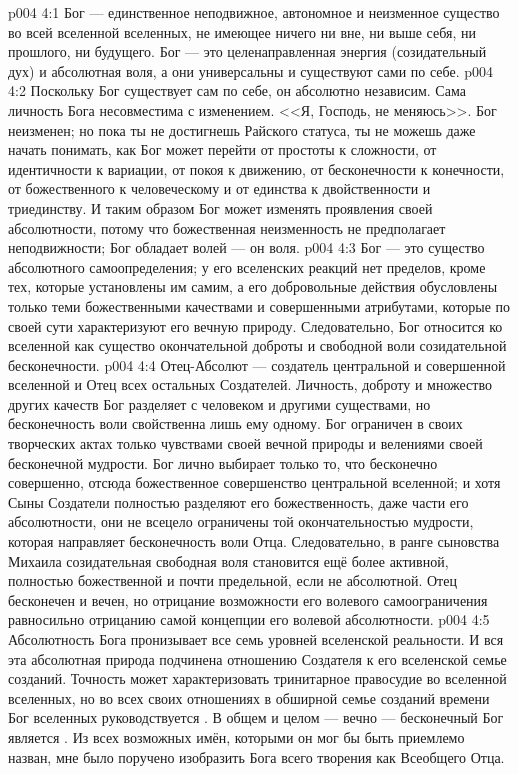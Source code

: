 \vs p004 4:1 Бог --- единственное неподвижное, автономное и неизменное существо во всей вселенной вселенных, не имеющее ничего ни вне, ни выше себя, ни прошлого, ни будущего. Бог --- это целенаправленная энергия (созидательный дух) и абсолютная воля, а они универсальны и существуют сами по себе.
\vs p004 4:2 Поскольку Бог существует сам по себе, он абсолютно независим. Сама личность Бога несовместима с изменением. <<Я, Господь, не меняюсь>>. Бог неизменен; но пока ты не достигнешь Райского статуса, ты не можешь даже начать понимать, как Бог может перейти от простоты к сложности, от идентичности к вариации, от покоя к движению, от бесконечности к конечности, от божественного к человеческому и от единства к двойственности и триединству. И таким образом Бог может изменять проявления своей абсолютности, потому что божественная неизменность не предполагает неподвижности; Бог обладает волей --- он  воля.
\vs p004 4:3 Бог --- это существо абсолютного самоопределения; у его вселенских реакций нет пределов, кроме тех, которые установлены им самим, а его добровольные действия обусловлены только теми божественными качествами и совершенными атрибутами, которые по своей сути характеризуют его вечную природу. Следовательно, Бог относится ко вселенной как существо окончательной доброты и свободной воли созидательной бесконечности.
\vs p004 4:4 Отец\hyp{}Абсолют --- создатель центральной и совершенной вселенной и Отец всех остальных Создателей. Личность, доброту и множество других качеств Бог разделяет с человеком и другими существами, но бесконечность воли свойственна лишь ему одному. Бог ограничен в своих творческих актах только чувствами своей вечной природы и велениями своей бесконечной мудрости. Бог лично выбирает только то, что бесконечно совершенно, отсюда божественное совершенство центральной вселенной; и хотя Сыны Создатели полностью разделяют его божественность, даже части его абсолютности, они не всецело ограничены той окончательностью мудрости, которая направляет бесконечность воли Отца. Следовательно, в ранге сыновства Михаила созидательная свободная воля становится ещё более активной, полностью божественной и почти предельной, если не абсолютной. Отец бесконечен и вечен, но отрицание возможности его волевого самоограничения равносильно отрицанию самой концепции его волевой абсолютности.
\vs p004 4:5 \pc Абсолютность Бога пронизывает все семь уровней вселенской реальности. И вся эта абсолютная природа подчинена отношению Создателя к его вселенской семье созданий. Точность может характеризовать тринитарное правосудие во вселенной вселенных, но во всех своих отношениях в обширной семье созданий времени Бог вселенных руководствуется . В общем и целом --- вечно --- бесконечный Бог является . Из всех возможных имён, которыми он мог бы быть приемлемо назван, мне было поручено изобразить Бога всего творения как Всеобщего Отца.
